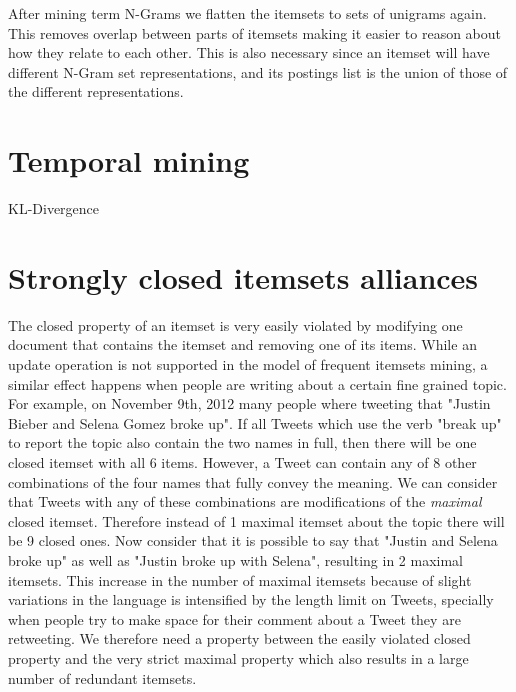 \documentclass{sig-alternate}
\begin{document}
After mining term N-Grams we flatten the itemsets to sets of unigrams again. This removes overlap between parts of  itemsets making it easier to reason about how they relate to each other. 
This is also necessary since an itemset will have different N-Gram set representations, and its  postings list is the union of those of the different representations.



\section{Temporal mining}
\label{sec:KLD}
KL-Divergence 

\section{Strongly closed itemsets alliances}
\label{sec:strong}
The closed property of an itemset is very easily violated by modifying one document that contains the itemset and removing one of its items. While an update operation is not supported in the model of frequent itemsets mining, a similar effect happens when people are writing about a certain fine grained topic. For example, on November 9th, 2012 many people where tweeting that "Justin Bieber and Selena Gomez broke up". If all Tweets which use the verb "break up" to report the topic also contain the two names in full, then there will be one closed itemset with all 6 items. However, a Tweet can contain any of 8 other combinations of the four names that fully convey the meaning. We can consider that Tweets with any of these combinations are modifications of the \emph{maximal} closed itemset. Therefore instead of 1 maximal itemset about the topic there will be 9 closed ones. Now consider that it is possible to say that "Justin and Selena broke up" as well as "Justin broke up with Selena", resulting in 2 maximal itemsets. This increase in the number of maximal itemsets because of slight variations in the language is intensified by the length limit on Tweets, specially when people try to make space for their comment about a Tweet they are retweeting. We therefore need a property between the easily violated closed property and the very strict maximal property which also results in a large number of redundant itemsets. 
\end{document}
